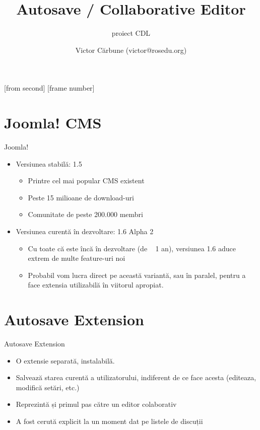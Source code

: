 \documentclass{beamer}
\title[Autosave / Collaborative Editor]{Autosave / Collaborative Editor}
\subtitle{proiect CDL}
\institute[Joomla!]{Joomla!}
\author[Victor C]{Victor Cărbune (victor@rosedu.org)}
\begin{document}
[from second]
[frame number]

\frame{\titlepage}

\section{Joomla! CMS}


\begin{frame}{Joomla!}
\begin{itemize}
	\item Versiunea stabilă: 1.5
		\begin{itemize}
		\pause
		\item Printre cel mai popular CMS existent		
		\pause
		\item Peste 15 milioane de download-uri
 		\pause
		\item Comunitate de peste 200.000 membri
		\end{itemize}
 	\pause
	\item Versiunea curentă în dezvoltare: 1.6 Alpha 2
		\begin{itemize}	
		\pause	
		\item Cu toate că este încă în dezvoltare (de ~ 1 an), versiunea 1.6 aduce extrem de multe feature-uri noi 
		\pause	
		\item Probabil vom lucra direct pe această variantă, sau în paralel, pentru a face extensia utilizabilă în viitorul apropiat.
		\end{itemize}
\end{itemize}
\end{frame}

\section{Autosave Extension}

\begin{frame}{Autosave Extension}
  \begin{itemize}
    \pause	
    \item O extensie separată, instalabilă.
    \pause	
    \item Salvează starea curentă a utilizatorului, indiferent de ce face acesta (editeaza, modifică setări, etc.)
    \pause
    \item Reprezintă și primul pas către un editor colaborativ
    \pause
    \item A fost cerută explicit la un moment dat pe listele de discuții
    \pause
  \end{itemize}
\end{frame}
\end{document}

